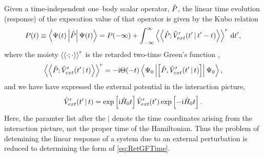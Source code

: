 Given a time-independent one--body scalar operator, $\hat{P}$, the linear time evolution (response) of the expecation value of that operator
is given by the Kubo relation 
\begin{equation}
\label{eq:Kubo}
P(t) \equiv \left\langle \Psi(t) \left\vert \hat{P} \right\vert \Psi(t) \right\rangle = P(-\infty) + \int_{-\infty}^\infty \left \langle \left \langle \hat{P}; \hat{V}'_{ext}(t' \,\vert\, t'-t) \right\rangle \right\rangle^r \,\mathrm{d} t',
\end{equation}
where the moiety $\left \langle \left \langle \cdot; \cdot \right\rangle \right\rangle^r$ is the retarded two-time Green's function ,
\begin{equation}
  \label{eq:RetGFTime}
  \left \langle \left \langle \hat{P}; \hat{V}'_{ext}(t' \,\vert\, t) \right\rangle \right\rangle^r = -\mathrm i \Theta(-t) \left\langle \Psi_0 \left\vert \left[\hat{P}, \hat{V}'_{ext}(t' \,\vert\, t) \right] \right\vert \Psi_0 \right\rangle,
\end{equation}
and we have have expressed the external potential in the interaction picture,
\begin{equation}
\hat{V}'_{ext}(t' \,\vert\, t) = \exp\left[\mathrm i \hat{H}_0 t\right] \hat{V}'_{ext}(t') \exp\left[-\mathrm i \hat{H}_0 t\right].
\end{equation}
Here, the paramter list after the $\vert$ denote the time coordinates arising from the interaction picture, not the proper time of 
the Hamiltonian.
Thus the problem of detemining the linear response of a system due to an external perturbation is reduced to determining
the form of \cref{eq:RetGFTime}.

